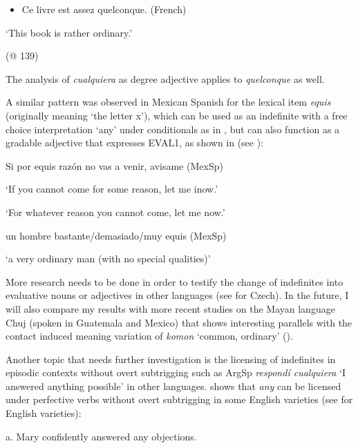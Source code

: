 \begin{itemize}
\item {        Ce livre est assez quelconque.                                                                                   (French)}
\end{itemize}
{‘This book is rather ordinary.’}

{(@ 139)}

The analysis of \textit{cualquiera} as degree adjective applies to \textit{quelconque} as well.

  A similar pattern was observed in Mexican Spanish for the lexical item \textit{equis} (originally meaning ‘the letter x’), which can be used as an indefinite with a free choice interpretation ‘any’ under conditionals as in , but can also function as a gradable adjective that expresses EVAL1, as shown in  (see \citealt{Author2020a}):

\label{bkm:Ref63462361}    Si por equis razón no vas a venir, avisame  (MexSp)

    ‘If you cannot come for some reason, let me inow.’  

    ‘For whatever reason you cannot come, let me now.’  

    \citep[137]{Author2020a}

\label{bkm:Ref63462370}    un hombre bastante/demasiado/muy equis  (MexSp)

    ‘a very ordinary man (with no special qualities)’  

    \citep[138]{Author2020a}

More research needs to be done in order to testify the change of indefinites into evaluative nouns or adjectives in other languages (see \citealt{Šimík2008} for Czech). In the future, I will also compare my results with more recent studies on the Mayan language Chuj (spoken in Guatemala and Mexico) that shows interesting parallels with the contact induced meaning variation of \textit{komon} ‘common, ordinary’ (\citealt{Alonso-OvalleRoyer2023}).

  Another topic that needs further investigation is the licensing of indefinites in episodic contexts without overt subtrigging such as ArgSp \textit{respondí cualquiera} ‘I answered anything possible’ in other languages. \citet{Dayal1998} shows that \textit{any} can be licensed under perfective verbs without overt subtrigging in some English varieties (see \citealt{Dayal1998} for English varieties):

    a. Mary confidently answered any objections.

